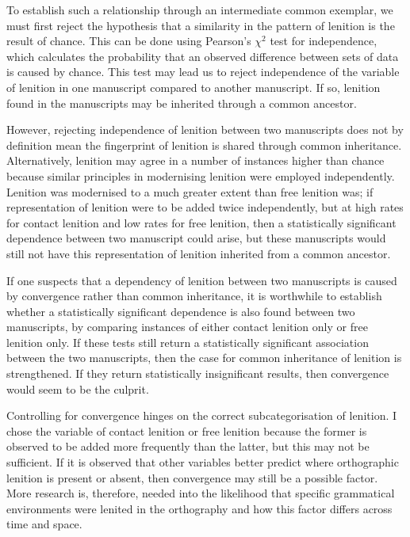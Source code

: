 To  establish such a relationship through an intermediate common exemplar, we must first reject the hypothesis that a similarity in the pattern of lenition is the result of chance. This can be done using Pearson's \(\chi^2\) test for independence, which calculates the probability that an observed difference between sets of data is caused by chance. This test may lead us to reject independence of the variable of lenition in one manuscript compared to another manuscript. If so, lenition found in the manuscripts may be inherited through a common ancestor.

However, rejecting independence of lenition between two manuscripts does not by definition mean the fingerprint of lenition is shared through common inheritance. Alternatively, lenition may agree in a number of instances higher than chance because similar principles in modernising lenition were employed independently. Lenition was modernised to a much greater extent than free lenition was; if representation of lenition were to be added twice independently, but at high rates for contact lenition and low rates for free lenition, then a statistically significant dependence between two manuscript could arise, but these manuscripts would still not have this representation of lenition inherited from a common ancestor.

If one suspects that a dependency of lenition between two manuscripts is caused by convergence rather than common inheritance, it is worthwhile to establish whether a statistically significant dependence is also found between two manuscripts, by comparing instances of either contact lenition only or free lenition only. If these tests still return a statistically significant association between the two manuscripts, then the case for common inheritance of lenition is strengthened. If they return statistically insignificant results, then convergence would seem to be the culprit.

Controlling for convergence hinges on the correct subcategorisation of lenition. I chose the variable of contact lenition or free lenition because the former is observed to be added more frequently than the latter, but this may not be sufficient. If it is observed that other variables better predict where orthographic lenition is present or absent, then convergence may still be a possible factor. More research is, therefore, needed into the likelihood that specific grammatical environments were lenited in the orthography and how this factor differs across time and space.

